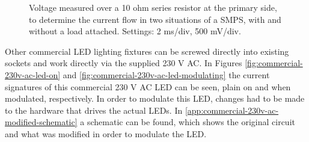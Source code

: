 \begin{figure}
	\centering     %

	\caption{Voltage measured over a 10 ohm series resistor at the primary side, to determine the current flow in two situations of a SMPS, with and without a load attached. Settings: 2 ms/div, 500 mV/div.}
\end{figure}



Other commercial LED lighting fixtures can be screwed directly into existing sockets and work directly via the supplied 230 V AC.
In Figures \ref{fig:commercial-230v-ac-led-on} and \ref{fig:commercial-230v-ac-led-modulating} the current signatures of this commercial 230 V AC LED can be seen, plain on and when modulated, respectively.
In order to modulate this LED, changes had to be made to the hardware that drives the actual LEDs.
In \autoref{app:commercial-230v-ac-modified-schematic} a schematic can be found, which shows the original circuit and what was modified in order to modulate the LED.









